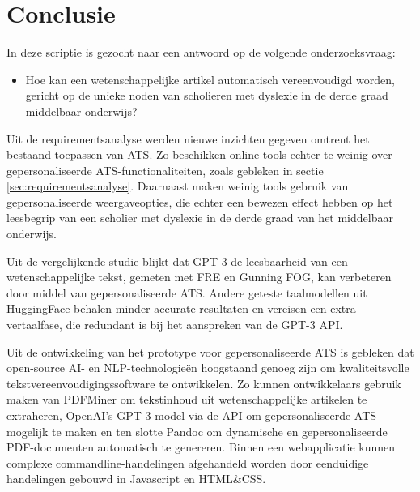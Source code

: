 
\chapter{Conclusie}%
\label{ch:conclusie}

In deze scriptie is gezocht naar een antwoord op de volgende onderzoeksvraag:

\begin{itemize}
	\item Hoe kan een wetenschappelijke artikel automatisch vereenvoudigd worden, gericht op de unieke noden van scholieren met dyslexie in de derde graad middelbaar onderwijs?
\end{itemize}

\medspace

Uit de requirementsanalyse werden nieuwe inzichten gegeven omtrent het bestaand toepassen van ATS. Zo beschikken online tools echter te weinig over gepersonaliseerde ATS-functionaliteiten, zoals gebleken in sectie \ref{sec:requirementsanalyse}. Daarnaast maken weinig tools gebruik van gepersonaliseerde weergaveopties, die echter een bewezen effect hebben op het leesbegrip van een scholier met dyslexie in de derde graad van het middelbaar onderwijs.

\medspace

Uit de vergelijkende studie blijkt dat GPT-3 de leesbaarheid van een wetenschappelijke tekst, gemeten met FRE en Gunning FOG, kan verbeteren door middel van gepersonaliseerde ATS. Andere geteste taalmodellen uit HuggingFace behalen minder accurate resultaten en vereisen een extra vertaalfase, die redundant is bij het aanspreken van de GPT-3 API.

\medspace

Uit de ontwikkeling van het prototype voor gepersonaliseerde ATS is gebleken dat open-source AI- en NLP-technologieën hoogstaand genoeg zijn om kwaliteitsvolle tekstvereenvoudigingssoftware te ontwikkelen. Zo kunnen ontwikkelaars gebruik maken van PDFMiner om tekstinhoud uit wetenschappelijke artikelen te extraheren, OpenAI's GPT-3 model via de API om gepersonaliseerde ATS mogelijk te maken en ten slotte Pandoc om dynamische en gepersonaliseerde PDF-documenten automatisch te genereren. Binnen een webapplicatie kunnen complexe commandline-handelingen afgehandeld worden door eenduidige handelingen gebouwd in Javascript en HTML\&CSS.